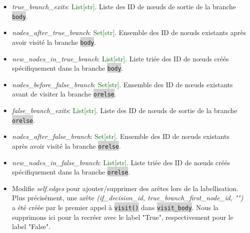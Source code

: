 \documentclass[11pt,a4paper]{article}
\newcommand{\code}[1]{\colorbox{lightgray}{\texttt{\small #1}}}
\newcommand{\var}[1]{\textit{#1}}
\newcommand{\vartype}[1]{\textcolor{darkgreen}{#1}}
\begin{document}
\begin{description}
\begin{itemize}
        \item \var{true\_branch\_exits}: \vartype{List[str]}. Liste des ID de nœuds de sortie de la branche \code{body}.
        \item \var{nodes\_after\_true\_branch}: \vartype{Set[str]}. Ensemble des ID de nœuds existants après avoir visité la branche \code{body}.
        \item \var{new\_nodes\_in\_true\_branch}: \vartype{List[str]}. Liste triée des ID de nœuds créés spécifiquement dans la branche \code{body}.
        \item \var{nodes\_before\_false\_branch}: \vartype{Set[str]}. Ensemble des ID de nœuds existants avant de visiter la branche \code{orelse}.
        \item \var{false\_branch\_exits}: \vartype{List[str]}. Liste des ID de nœuds de sortie de la branche \code{orelse}.
        \item \var{nodes\_after\_false\_branch}: \vartype{Set[str]}. Ensemble des ID de nœuds existants après avoir visité la branche \code{orelse}.
        \item \var{new\_nodes\_in\_false\_branch}: \vartype{List[str]}. Liste triée des ID de nœuds créés spécifiquement dans la branche \code{orelse}.
        \item Modifie \var{self.edges} pour ajouter/supprimer des arêtes lors de la labellisation. Plus précisément, une arête \var{(if\_decision\_id, true\_branch\_first\_node\_id, "")} a été créée par le premier appel à \code{visit()} dans \code{visit\_body}. Nous la supprimons ici pour la recréer avec le label "True", respectivement pour le label "False".
    \end{itemize}
\end{description}
\end{document}
